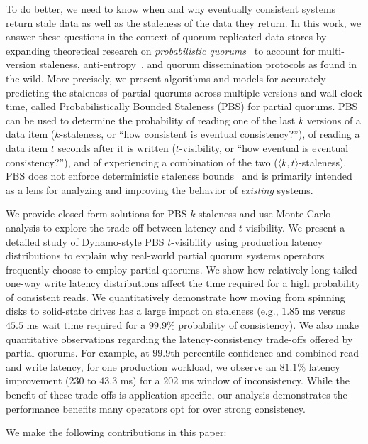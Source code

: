 \documentclass{vldb}
\begin{document}
To do better, we need to know when and why eventually consistent
systems return stale data as well as the staleness of the data they
return.  In this work, we answer these questions in the context of
quorum replicated data stores by expanding theoretical research on
\textit{probabilistic quorums}~\cite{prob-quorum, quorum-overview} to
account for multi-version staleness, anti-entropy~\cite{antientropy}, and quorum
dissemination protocols as found in the wild.  More precisely, we
present algorithms and models for accurately predicting the staleness
of partial quorums across multiple versions and wall clock time,
called Probabilistically Bounded Staleness (PBS) for partial
quorums. PBS can be used to determine the probability of reading one
of the last $k$ versions of a data item ($k$-staleness, or ``how
consistent is eventual consistency?''), of reading a data item $t$
seconds after it is written ($t$-visibility, or ``how eventual is
eventual consistency?''), and of experiencing a combination of the two
($\langle k, t \rangle$-staleness). PBS does not enforce deterministic
staleness bounds~\cite{ aqua, trapp,vahdat-article, vahdat-bounded,
  frac} and is primarily intended as a lens for analyzing and
improving the behavior of \textit{existing} systems.

We provide closed-form solutions for PBS $k$-staleness and use Monte
Carlo analysis to explore the trade-off between latency and
$t$-visibility.  We present a detailed study of Dynamo-style PBS
$t$-visibility using production latency distributions to explain why
real-world partial quorum systems operators frequently choose to
employ partial quorums. We show how relatively long-tailed one-way
write latency distributions affect the time required for a high
probability of consistent reads.  We quantitatively demonstrate how
moving from spinning disks to solid-state drives has a large impact on
staleness (e.g., $1.85$ ms versus $45.5$ ms wait time required for a
$99.9$\% probability of consistency).  We also make quantitative
observations regarding the latency-consistency trade-offs offered by
partial quorums.  For example, at $99.9$th percentile confidence and
combined read and write latency, for one production workload, we
observe an $81.1\%$ latency improvement ($230$ to $43.3$ ms) for a
$202$ ms window of inconsistency.  While the benefit of these
trade-offs is application-specific, our analysis demonstrates the
performance benefits many operators opt for over strong consistency.

We make the following contributions in this paper:
\end{document}
